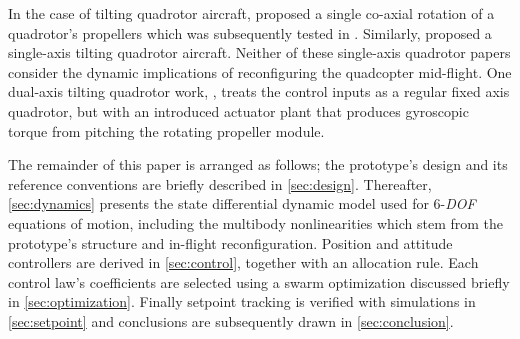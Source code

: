\documentclass[a4paper, 10pt, conference]{ieeeconf}
\begin{document}
\par
In the case of tilting quadrotor aircraft, \cite{tiltingmodelling} proposed a single co-axial rotation of a quadrotor's propellers which was subsequently tested in \cite{tiltingtest}. Similarly, \cite{nemati} proposed a single-axis tilting quadrotor aircraft. Neither of these single-axis quadrotor papers consider the dynamic implications of reconfiguring the quadcopter mid-flight. One dual-axis tilting quadrotor work, \cite{tiltgasco}, treats the control inputs as a regular fixed axis quadrotor, but with an introduced actuator plant that produces gyroscopic torque from pitching the rotating propeller module.
\par
The remainder of this paper is arranged as follows; the prototype's design and its reference conventions are briefly described in \ref{sec:design}. Thereafter, \ref{sec:dynamics} presents the state differential dynamic model used for 6-\emph{DOF} equations of motion, including the multibody nonlinearities which stem from the prototype's structure and in-flight reconfiguration. Position and attitude controllers are derived in \ref{sec:control}, together with an allocation rule. Each control law's coefficients are selected using a swarm optimization discussed briefly in \ref{sec:optimization}. Finally setpoint tracking is verified with simulations in \ref{sec:setpoint} and conclusions are subsequently drawn in \ref{sec:conclusion}.
\end{document}
